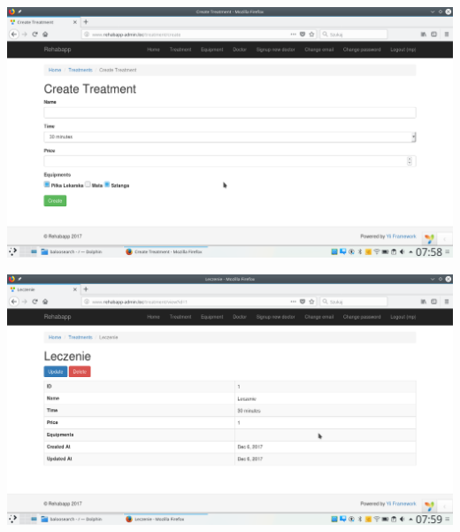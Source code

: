 \begin{itemize}
\vspace{0,5cm}
\includegraphics[scale=0.4]{obraz/10.png}
\vspace{0,5cm}

\vspace{0,5cm}
\includegraphics[scale=0.4]{obraz/11.png}
\vspace{0,5cm}


\end{itemize}
